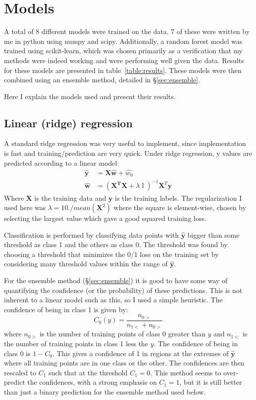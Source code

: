 \documentclass{article} %
\DeclareMathOperator{\identity}{\mathbb{I}}
\newcommand{\vect}[1]{\mathbf{#1}}
\newcommand{\mat}[1]{\mathbf{#1}}
\begin{document}
\section{Models}
\label{sec:models}
A total of 8 different models were trained on the data.  7 of these were written by me in python using numpy and scipy.  Additionally, a random forest model was trained using scikit-learn, which was chosen primarily as a verification that my methods were indeed working and were performing well given the data.  Results for these models are presented in table~\ref{table:results}.  These models were then combined using an ensemble method, detailed in \S\ref{sec:ensemble}.  

Here I explain the models used and present their results.

\subsection{Linear (ridge) regression}
\label{model:linear}
A standard ridge regression was very useful to implement, since implementation is fast and training/prediction are very quick.  Under ridge regression, y values are predicted according to a linear model:
\begin{align}
\label{eq:linearmodel}
\vect{\hat{y}} &= \mat{X}\vect{\hat{w}} + \hat{w_0} \\
\label{eq:ridge_weights}
\vect{\hat{w}} &= \left( \mat{X^T} \mat{X} + \lambda \identity  \right)^{-1} \mat{X}^T \vect{y}
\end{align}
Where $\mat{X}$ is the training data and $\vect{y}$ is the training labels. The regularization I used here was $\lambda = 10./mean(\mat{X}^2)$ where the square is element-wise, chosen by selecting the largest value which gave a good squared training loss.

Classification is performed by classifying data points with $\vect{\hat{y}}$ bigger than some threshold as class 1 and the others as class 0.  The threshold was found by choosing a threshold that minimizes the 0/1 loss on the training set by considering many threshold values within the range of $\vect{\hat{y}}$. 

For the ensemble method (\S\ref{sec:ensemble}) it is good to have some way of quantifying the confidence (or the probability) of these predictions.  This is not inherent to a linear model such as this, so I used a simple heuristic.  The confidence of being in class 1 is given by:
\begin{equation}
C_0(y) = \frac{n_{0>}}{n_{1<} + n_{0>}}
\end{equation}
where $n_{0>}$ is the number of training points of class 0 greater than $y$ and $n_{1<}$ is the number of training points in class 1 less the $y$.  The confidence of being in class 0 is $1-C_0$.  This gives a confidence of 1 in regions at the extremes of $\vect{\hat{y}}$ where all training points are in one class or the other.  The confidences are then rescaled to $C_1$ such that at the threshold $C_1=0$.  This method seems to over-predict the confidences, with a strong emphasis on $C_1 = 1$, but it is still better than just a binary prediction for the ensemble method used below.
\end{document}
